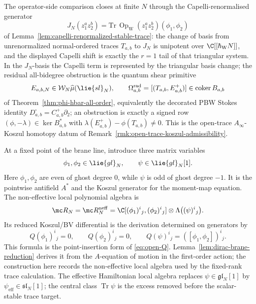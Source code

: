 \documentclass[11pt]{memoir}
\begin{document}
The operator-side comparison closes at finite \(N\) through the
Capelli-renormalised generator
\[
  J_N(z_1^az_2^b)
   =\mathrm{Tr}\,\operatorname{Op}_{\mathrm W}(z_1^az_2^b)
     (\phi_1,\phi_2)
\]
of Lemma~\ref{lem:capelli-renormalized-stable-trace}: the change of
basis from unrenormalized normal-ordered traces \(T_{a,b}\) to \(J_N\) is
unipotent over \(\C[[\hbar_{\mathrm{W}}N]]\), and the displayed Capelli shift is
exactly the \(r=1\) tail of that triangular system.  In the
\(J_N\)-basis the Capelli term is represented by the triangular basis
change; the residual all-bidegree
obstruction is the quantum shear primitive
\[
  E_{a,b,N}\in\mathcal W_N\widehat\mu(\lie{sl}_N),\qquad
  \Omega^{\mathrm{rad}}_{a,b}
   =[(T_{a,b},E^+_{a,b})]
   \in\operatorname{coker}B_{a,b}
\]
of Theorem~\ref{thm:phi-hbar-all-order}, equivalently the decorated
PBW Stokes identity \(D^\square_{a,b}=C^+_{a,b}\partial_2\); an
obstruction is exactly a signed row \((\phi,-\lambda)\in\ker B_{a,b}^*\)
with \(\lambda(E^+_{a,b})-\phi(T_{a,b})\ne 0\).  This is the open-trace
\(A_\infty\)-Koszul homotopy datum of
Remark~\ref{rmk:open-trace-koszul-admissibility}.

\begin{constr}\label{constr:reduced-bv-algebra}
  At a fixed point of the brane line, introduce three matrix variables
  $$\phi_1,\phi_2\in\lie{gl}_N,\qquad \psi\in\lie{gl}_N[1].$$
  Here \(\phi_1,\phi_2\) are even of ghost degree \(0\), while
  \(\psi\) is odd of ghost degree \(-1\).  It is the pointwise
  antifield \(A^*\) and the Koszul generator for the moment-map
  equation.
  The non-effective local polynomial algebra is
  $$\mc R_N=\mc R_N^{\mathrm{neff}}
    =\C[(\phi_1)^i{}_j,(\phi_2)^i{}_j]
    \otimes\Lambda\bigl((\psi)^i{}_j\bigr).$$
  Its reduced Koszul/BV differential is the derivation determined on generators by
  $$Q(\phi_1)^i{}_j=0,\qquad Q(\phi_2)^i{}_j=0,\qquad
    Q(\psi)^i{}_j=([\phi_1,\phi_2])^i{}_j.$$
  This formula is the point-insertion form of
  \eqref{eq:open-Q}.  Lemma~\ref{lem:dirac-brane-reduction} derives it
  from the \(A\)-equation of motion in the first-order action; the
  construction here records the non-effective local algebra used by the
  fixed-rank trace calculation.  The effective Hamiltonian local algebra
  replaces \(\psi\in\mathfrak{gl}_N[1]\) by
  \(\psi_{\mathrm{eff}}\in\mathfrak{sl}_N[1]\); the central class
  \(\operatorname{Tr}\psi\) is the excess removed before the
  scalar-stable trace target.
\end{constr}
\end{document}
